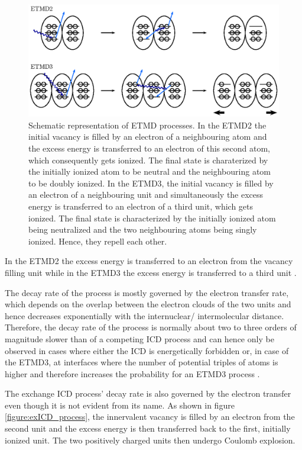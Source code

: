 \begin{figure}[h]
 \centering
 \includegraphics{pics/etmd-pspic.eps}
 \caption{Schematic representation of \ac{ETMD} processes. In the ETMD2 the initial
          vacancy is filled by an electron of a neighbouring atom and the excess
          energy is transferred to an electron of this second atom, which
          consequently gets ionized. The final state is charaterized by the initially
          ionized atom to be neutral and the neighbouring atom to be doubly ionized.
          In the \ac{ETMD}3, the initial vacancy is filled by an electron of a
          neighbouring unit and simultaneously the excess energy is transferred to
          an electron of a third unit, which gets ionized. The final state is
          characterized by the initially ionized atom being neutralized and the
          two neighbouring atoms being singly ionized. Hence, they repell each other.}
 \label{figure:etmd_processes}
\end{figure}

In the ETMD2 \cite{Zobeley01} the excess energy is transferred to an electron
from the vacancy filling unit while in the ETMD3 the excess energy is transferred
to a third unit \cite{Zobeley98}.

The decay rate of the process is mostly governed by the electron transfer rate, which
depends on the overlap between the electron clouds of the two units and hence
decreases exponentially with the internuclear/ intermolecular distance. Therefore,
the decay rate of the process is normally about two to three orders of magnitude slower
than of a competing ICD process and can hence only be observed in cases where either
the ICD is energetically forbidden or, in case of the ETMD3, at interfaces
where the number of potential
triples of atoms is higher and therefore increases the probability for an ETMD3 process
\cite{Fasshauer13}.

The exchange ICD process' decay rate is also governed by the electron transfer
even though it is not evident from its name. As shown in
figure \ref{figure:exICD_process}, the innervalent vacancy is filled by an electron
from the second unit and the excess energy is then transferred back to the first,
initially ionized unit. The two positively charged units then undergo Coulomb
explosion.

